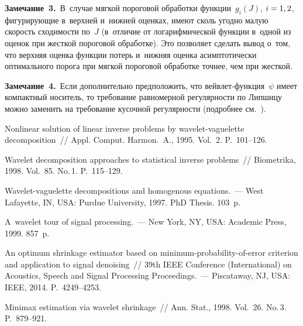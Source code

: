 \begin{multicols}{2}
\smallskip

\noindent
\textbf{Замечание~3.}\ В~случае мягкой пороговой обработки функции~$g_i(J)$, $i\hm=1,2$, 
фигурирующие в~верх\-ней и~ниж\-ней оценках, имеют сколь угодно малую ско\-рость 
сходимости по~$J$ (в~отличие от логарифмической функции в~одной из оценок при
 жест\-кой пороговой обработке). Это позволяет сделать вывод о~том, что верх\-няя 
 оценка функции потерь и~ниж\-няя оценка асимптотически оптимального порога 
 при мягкой пороговой обработке точ\-нее, чем при жест\-кой.

\smallskip

\noindent
\textbf{Замечание~4.}\ Если дополнительно предположить, что вейв\-лет-функ\-ция~$\psi$ 
имеет компактный носитель, то требование равномерной ре\-гу\-ляр\-ности по Липшицу 
можно заменить на требование кусочной ре\-гу\-ляр\-ности (подробнее см.~\cite{Jan01}).


{\small\frenchspacing
 {%
 \begin{thebibliography}{99}




 Nonlinear solution of linear inverse problems by wavelet-vaguelette 
decomposition~// Appl. Comput. Harmon.~A., 1995. Vol.~2. P.~101--126.

 Wavelet decomposition approaches 
to statistical inverse problems~// Biometrika, 1998. Vol.~85. No.\,1. P.~115--129.

 Wavelet-vaguelette decompositions and homogenous equations.~---
 West Lafayette, IN, USA: Purdue University, 1997.   PhD Thesis. 103~p.


 A~wavelet tour of signal processing.~--- New York, NY, USA:
Academic Press, 1999. 857~p.


An optimum shrinkage estimator based on minimum-probability-of-error criterion 
and application to signal denoising~// 
    39th IEEE  Conference (International) on Acoustics, 
    Speech and Signal Processing Proceedings.~--- Piscataway, NJ, USA: IEEE, 2014. 
    P.~4249--4253.

 Minimax estimation via wavelet shrinkage~// 
Ann. Stat., 1998. Vol.~26. No.\,3. P.~879--921.




\end{thebibliography}}}
\end{multicols}
